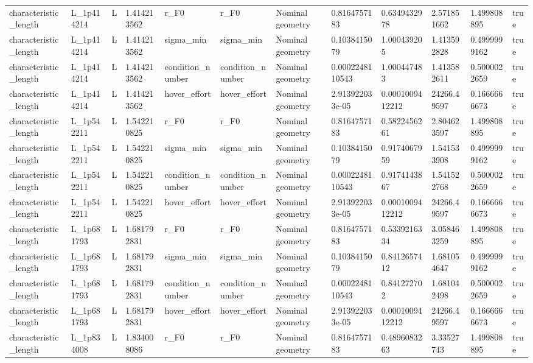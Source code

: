 \begin{tabular}{@{}llllllllllll@{}}
characteristic\_length & L\_1p414214 & L & 1.414213562 & r\_F0 & r\_F0 & Nominal geometry & 0.8164757183 & 0.6349432978 & 2.571851662 & 1.499808895 & true \\
characteristic\_length & L\_1p414214 & L & 1.414213562 & sigma\_min & sigma\_min & Nominal geometry & 0.1038415079 & 1.000439205 & 1.413592828 & 0.4999999162 & true \\
characteristic\_length & L\_1p414214 & L & 1.414213562 & condition\_number & condition\_number & Nominal geometry & 0.0002248110543 & 1.000447483 & 1.413582611 & 0.5000022659 & true \\
characteristic\_length & L\_1p414214 & L & 1.414213562 & hover\_effort & hover\_effort & Nominal geometry & 2.913922033e-05 & 0.0001009412212 & 24266.49597 & 0.1666666673 & true \\
characteristic\_length & L\_1p542211 & L & 1.542210825 & r\_F0 & r\_F0 & Nominal geometry & 0.8164757183 & 0.5822456261 & 2.804623597 & 1.499808895 & true \\
characteristic\_length & L\_1p542211 & L & 1.542210825 & sigma\_min & sigma\_min & Nominal geometry & 0.1038415079 & 0.9174067959 & 1.541533908 & 0.4999999162 & true \\
characteristic\_length & L\_1p542211 & L & 1.542210825 & condition\_number & condition\_number & Nominal geometry & 0.0002248110543 & 0.9174143867 & 1.541522768 & 0.5000022659 & true \\
characteristic\_length & L\_1p542211 & L & 1.542210825 & hover\_effort & hover\_effort & Nominal geometry & 2.913922033e-05 & 0.0001009412212 & 24266.49597 & 0.1666666673 & true \\
characteristic\_length & L\_1p681793 & L & 1.681792831 & r\_F0 & r\_F0 & Nominal geometry & 0.8164757183 & 0.5339216334 & 3.058463259 & 1.499808895 & true \\
characteristic\_length & L\_1p681793 & L & 1.681792831 & sigma\_min & sigma\_min & Nominal geometry & 0.1038415079 & 0.8412657412 & 1.681054647 & 0.4999999162 & true \\
characteristic\_length & L\_1p681793 & L & 1.681792831 & condition\_number & condition\_number & Nominal geometry & 0.0002248110543 & 0.841272702 & 1.681042498 & 0.5000022659 & true \\
characteristic\_length & L\_1p681793 & L & 1.681792831 & hover\_effort & hover\_effort & Nominal geometry & 2.913922033e-05 & 0.0001009412212 & 24266.49597 & 0.1666666673 & true \\
characteristic\_length & L\_1p834008 & L & 1.834008086 & r\_F0 & r\_F0 & Nominal geometry & 0.8164757183 & 0.4896083263 & 3.33527743 & 1.499808895 & true \\

\end{tabular}
